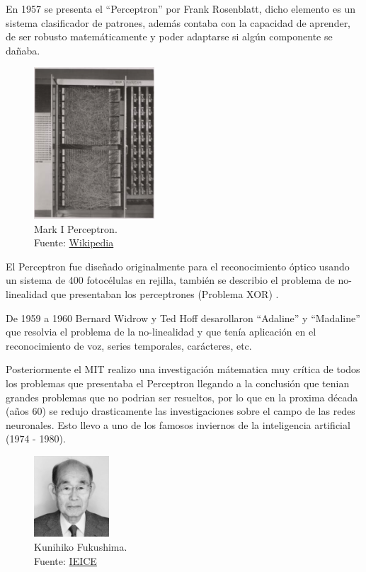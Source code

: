 En 1957 se presenta el ``Perceptron'' por {Frank Rosenblatt}, dicho elemento es un sistema clasificador de patrones, además contaba con la capacidad de aprender, de ser robusto matemáticamente y poder adaptarse si algún componente se dañaba.

\begin{figure}[H]
  \centering
  \includegraphics[width=0.4\textwidth]{figures/perceptron.png}
  \caption{Mark I Perceptron. \\Fuente: \href{https://en.wikipedia.org/wiki/Perceptron}{Wikipedia}}
  \label{fig:perceptron}
\end{figure}

El Perceptron fue diseñado originalmente para el reconocimiento óptico usando un sistema de 400 fotocélulas en rejilla, también se describio el problema de no-linealidad que presentaban los perceptrones (Problema XOR) \cite{cuevastello2018apuntes}.

De 1959 a 1960 {Bernard Widrow} y {Ted Hoff} desarollaron ``Adaline'' y ``Madaline'' \cite{widrow1960adaptive} que resolvia el problema de la no-linealidad y que tenía aplicación en el reconocimiento de voz, series temporales, carácteres, etc.

Posteriormente el MIT realizo una investigación mátematica muy crítica de todos los problemas que presentaba el Perceptron llegando a la conclusión que tenian grandes problemas que no podrian ser resueltos, por lo que en la proxima década (años 60) se redujo drasticamente las investigaciones sobre el campo de las redes neuronales.
Esto llevo a uno de los famosos inviernos de la inteligencia artificial (1974 - 1980).

\begin{figure}[H]
  \centering
  \includegraphics[width=0.25\textwidth]{figures/Kunihiko Fukushima.jpg}
  \caption{Kunihiko Fukushima. \\Fuente: \href{https://www.ieice.org/eng/about_ieice/new_honorary_members_award_winners/2017/meiyo_05e.html}{IEICE}}
  \label{fig:kunihiko-fukushima}
\end{figure}

